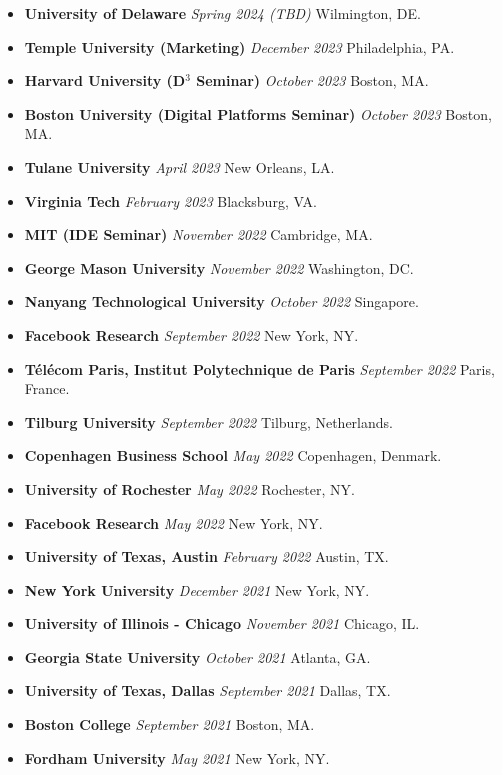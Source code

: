 \documentclass[10.5pt,letterpaper,sans]{moderncv}        %
\begin{document}
\begin{itemize}
\item \textbf{University of Delaware} \textit{Spring 2024 (TBD)} Wilmington, DE.
\item \textbf{Temple University (Marketing)} \textit{December 2023} Philadelphia, PA.
\item \textbf{Harvard University (D$^3$ Seminar)} \textit{October 2023} Boston, MA.
\item \textbf{Boston University (Digital Platforms Seminar)} \textit{October 2023} Boston, MA.
\item \textbf{Tulane University} \textit{April 2023} New Orleans, LA.
\item \textbf{Virginia Tech} \textit{February 2023} Blacksburg, VA.
\item \textbf{MIT (IDE Seminar)} \textit{November 2022} Cambridge, MA.
\item \textbf{George Mason University} \textit{November 2022} Washington, DC.
\item \textbf{Nanyang Technological University} \textit{October 2022} Singapore.
\item \textbf{Facebook Research} \textit{September 2022} New York, NY.
\item \textbf{T\'el\'ecom Paris, Institut Polytechnique de Paris} \textit{September 2022} Paris, France.
\item \textbf{Tilburg University} \textit{September 2022} Tilburg, Netherlands.
\item \textbf{Copenhagen Business School} \textit{May 2022} Copenhagen, Denmark.
\item \textbf{University of Rochester} \textit{May 2022} Rochester, NY.
\item \textbf{Facebook Research} \textit{May 2022} New York, NY.
\item \textbf{University of Texas, Austin} \textit{February 2022} Austin, TX.
\item \textbf{New York University} \textit{December 2021} New York, NY.
\item \textbf{University of Illinois - Chicago} \textit{November 2021} Chicago, IL.
\item \textbf{Georgia State University} \textit{October 2021} Atlanta, GA.
\item \textbf{University of Texas, Dallas} \textit{September 2021} Dallas, TX.
\item \textbf{Boston College} \textit{September 2021} Boston, MA.
\item \textbf{Fordham University} \textit{May 2021} New York, NY.

\end{itemize}
\end{document}
